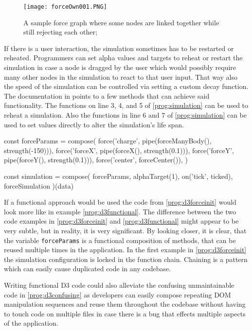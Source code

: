 \begin{figure}
  \centering
  \texttt{[image: forceOwn001.PNG]}
  \caption{A sample force graph where some nodes are linked together while still rejecting each other;}
  \label{fig:force005}
\end{figure}

If there is a user interaction, the simulation sometimes has to be restarted or reheated. Programmers can set alpha values and targets to reheat or restart the simulation in case a node is dragged by the user which would possibly require many other nodes in the simulation to react to that user input. That way also the speed of the simulation can be controlled via setting a custom decay function. The documentation in \cite[/d3-force/blob/master/README.md]{D3Github} points to a few methods that can achieve said functionality. The functions on line 3, 4, and 5 of \ref{prog:simulation} can be used to reheat a simulation. Also the functions in line 6 and 7 of \ref{prog:simulation} can be used to set values directly to alter the simulation's life span.

\begin{program}
\caption{D3 written in a fictional functional way}
\label{prog:d3functional}
\begin{JsCode}
const forceParams = compose(
  force('charge', pipe(forceManyBody(), strength(-150))),
  force('forceX', pipe(forceX(), strength(0.1))),
  force('forceY', pipe(forceY(), strength(0.1))),
  force('center', forceCenter()),
)

const simulation = compose(
  forceParams,
  alphaTarget(1),
  on('tick', ticked),
  forceSimulation
)(data)
\end{JsCode}
\end{program}

If a functional approach would be used the code from \ref{prog:d3forceinit} would look more like in example \ref{prog:d3functional}. The difference between the two code examples in \ref{prog:d3forceinit} and \ref{prog:d3functional} might appear to be very subtle, but in reality, it is very significant. By looking closer, it is clear, that the variable \texttt{forceParams} is a functional composition of methods, that can be reused multiple times in the application. In the first example in \ref{prog:d3forceinit} the simulation configuration is locked in the function chain. Chaining is a pattern which can easily cause duplicated code in any codebase. 

Writing functional D3 code could also alleviate the confusing unmaintainable code in \ref{prog:d3confusing} as developers can easily compose repeating DOM manipulation sequences and reuse them throughout the codebase without having to touch code on multiple files in case there is a bug that effects multiple aspects of the application.
